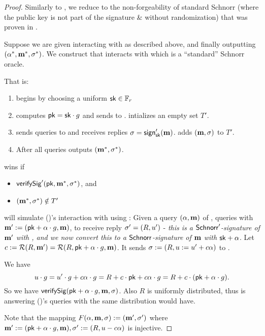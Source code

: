 \documentclass[11pt]{article}
\numberwithin{equation}{section} %
\numberwithin{figure}{section} %
\begin{document}
\begin{proof}
Similarly to \cite{rerandSig},
we reduce to the non-forgeability of standard Schnorr (where the public key is not part of the signature \& without randomization)
that was proven in \cite{schnorrSecurity}.


Suppose we are given \adv interacting with \oracle as described above, and finally outputting $(\alpha^*,\mathbf m^*,\sigma^*)$.
We construct \advprime that interacts with \oracleprime which is a ``standard'' Schnorr oracle.

That is:
\begin{enumerate} 
\item \oracleprime begins by choosing a uniform $\mathsf{sk}\in {\mathbb F}_r$ 
\item \oracleprime computes $\mathsf{pk} = \mathsf{sk}\cdot g$ and sends \pk to \advprime. \oracleprime intializes an empty set $T'$.
\item \advprime sends queries \msg to \oracleprime and receives replies $\sigma = \mathsf{sign}'_{\mathsf{sk}}(\mathbf m)$. \oracleprime adds $(\mathbf m,\sigma)$ to $T'$.
\item After all queries \advprime outputs $(\mathbf m^*,\sigma^*)$.
\end{enumerate}
\advprime wins if
\begin{itemize}
   \item $\mathsf{verifySig}'(\mathsf{pk},\mathbf m^*,\sigma^*)$, and 
   \item $(\mathbf m^*,\sigma^*)\notin T'$
\end{itemize}
 
\advprime will simulate (\adv)'s interaction with \oracle using \oracleprime:
Given a query $(\alpha,\mathbf m)$ of \adv, \advprime queries \oracleprime with $\mathbf m':=(\mathsf{pk}+\alpha\cdot g,\mathbf m)$,
to receive reply $\sigma'=(R,u')$ - \emph{this is a $\mathsf{Schnorr}'$-signature of $\mathbf m'$ with \sk, and we now convert this to a $\mathsf{Schnorr}$-signature of $\mathbf m$ with $\mathsf{sk}+\alpha$}.
Let $c:= \mathcal R(R,\mathbf m')=\mathcal R(R,\mathsf{pk}+\alpha\cdot g, \mathbf m)$. It sends $\sigma:= (R,u:= u'+c\alpha)$ to \adv.


 We have 
\[u\cdot g = u'\cdot g +c\alpha\cdot g = R+c\cdot \mathsf{pk} +c\alpha\cdot g = R+ c\cdot (\mathsf{pk}+\alpha\cdot g) .\]
So we have $\mathsf{verifySig}(\mathsf{pk}+\alpha\cdot g,\mathbf m,\sigma)$.
Also $R$ is uniformly distributed, thus \advprime is answering (\adv)'s queries with the same distribution \oracle would have.

Note that the mapping $F(\alpha,\mathbf m,\sigma):= (\mathbf m',\sigma')$
where $\mathbf m':=(\mathsf{pk}+\alpha\cdot g,\mathbf m),\sigma':= (R,u-c\alpha)$ is injective.


\end{proof}
\end{document}
